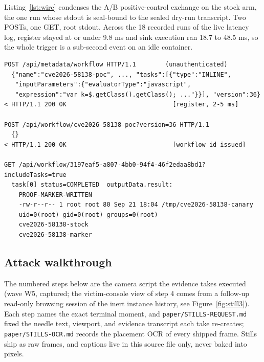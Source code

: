 \documentclass[journal]{IEEEtran}
\begin{document}
Listing~\ref{lst:wire} condenses the A/B positive-control exchange on the
stock arm, the one run whose stdout is seal-bound to the sealed dry-run
transcript. Two POSTs, one GET, root stdout. Across the 18 recorded runs of
the live latency log, register stayed at or under 9.8 ms and sink execution
ran 18.7 to 48.5 ms, so the whole trigger is a sub-second event on an idle
container.

\begin{lstlisting}[style=yargen,caption={Condensed wire exchange from
\texttt{evidence/fix-verification/}\allowbreak\texttt{run-stock/}\allowbreak\texttt{positive-control-run.txt}
(stdout seal-bound to the sealed dry-run transcript; polling trimmed, values
verbatim). The register
POST answers 200, the start POST returns a workflow id, and the task's
\texttt{outputData.result} carries the root command's stdout back to the
anonymous caller.},label={lst:wire}]
POST /api/metadata/workflow HTTP/1.1        (unauthenticated)
  {"name":"cve2026-58138-poc", ..., "tasks":[{"type":"INLINE",
   "inputParameters":{"evaluatorType":"javascript",
   "expression":"var k=$.getClass().getClass(); ..."}}], "version":36}
< HTTP/1.1 200 OK                             [register, 2-5 ms]

POST /api/workflow/cve2026-58138-poc?version=36 HTTP/1.1
  {}
< HTTP/1.1 200 OK                             [workflow id issued]

GET /api/workflow/3197eaf5-a807-4bb0-94f4-46f2edaa8bd1?includeTasks=true
  task[0] status=COMPLETED  outputData.result:
    PROOF-MARKER-WRITTEN
    -rw-r--r-- 1 root root 80 Sep 21 18:04 /tmp/cve2026-58138-canary
    uid=0(root) gid=0(root) groups=0(root)
    cve2026-58138-stock
    cve2026-58138-marker
\end{lstlisting}

\subsection{Attack walkthrough}
\label{sec:walkthrough}

The numbered steps below are the camera script the evidence takes executed
(wave W5, captured; the victim-console view of step 4 comes from a follow-up
read-only browsing session of the inert instance history, see
Figure~\ref{fig:still3}). Each step names the exact terminal moment, and
\texttt{paper/STILLS-REQUEST.md} fixed the needle text, viewport, and
evidence transcript each take re-creates; \texttt{paper/STILLS-OCR.md}
records the placement OCR of every shipped frame. Stills ship as raw frames,
and captions live in this source file only, never baked into pixels.
\end{document}
